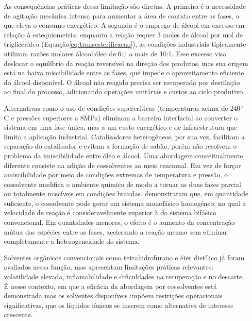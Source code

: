 As consequências práticas dessa limitação são diretas. A primeira é a necessidade de agitação mecânica intensa para aumentar a área de contato entre as fases, o que eleva o consumo energético. A segunda é o emprego de álcool em excesso em relação à estequiometria: enquanto a reação requer 3 moles de álcool por mol de triglicerídeo (Equação\ref{eq:transesterificacao}), as condições industriais tipicamente utilizam razões molares álcool:óleo de 6:1 a mais de 10:1\cite{verma2016,ma2016}. Esse excesso visa deslocar o equilíbrio da reação reversível na direção dos produtos, mas sua origem está na baixa miscibilidade entre as fases, que impede o aproveitamento eficiente do álcool disponível. O álcool não reagido precisa ser recuperado por destilação ao final do processo, adicionando operações unitárias e custos ao ciclo produtivo\cite{dabdoub2009}.

Alternativas como o uso de condições supercríticas (temperaturas acima de 240\,$^{\circ}$C e pressões superiores a 8MPa) eliminam a barreira interfacial ao converter o sistema em uma fase única, mas a um custo energético e de infraestrutura que limita a aplicação industrial\cite{dabdoub2009}. Catalisadores heterogêneos, por sua vez, facilitam a separação do catalisador e evitam a formação de sabão, porém não resolvem o problema da imiscibilidade entre óleo e álcool\cite{leung2010}. Uma abordagem conceitualmente diferente consiste na adição de cossolventes ao meio reacional. Em vez de forçar amiscibilidade por meio de condições extremas de temperatura e pressão, o cossolvente modifica o ambiente químico de modo a tornar as duas fases parcial ou totalmente miscíveis em condições brandas\cite{roosta2016}.  demonstraram que, em quantidade suficiente, o cossolvente pode gerar um sistema monofásico homogêneo, no qual a velocidade de reação é consideravelmente superior à do sistema bifásico convencional. Em quantidades menores, o efeito é o aumento da concentração mútua das espécies entre as fases, acelerando a reação mesmo sem eliminar completamente a heterogeneidade do sistema.

Solventes orgânicos convencionais como tetrahidrofurano e éter dietílico já foram avaliados nessa função\cite{encinar2016,roosta2016}, mas apresentam limitações práticas relevantes: volatilidade elevada, inflamabilidade e dificuldades na recuperação e no descarte. É nesse contexto, em que a eficácia da abordagem por cossolventes está demonstrada mas os solventes disponíveis impõem restrições operacionais significativas, que os líquidos iônicos se inserem como alternativa de interesse crescente.

